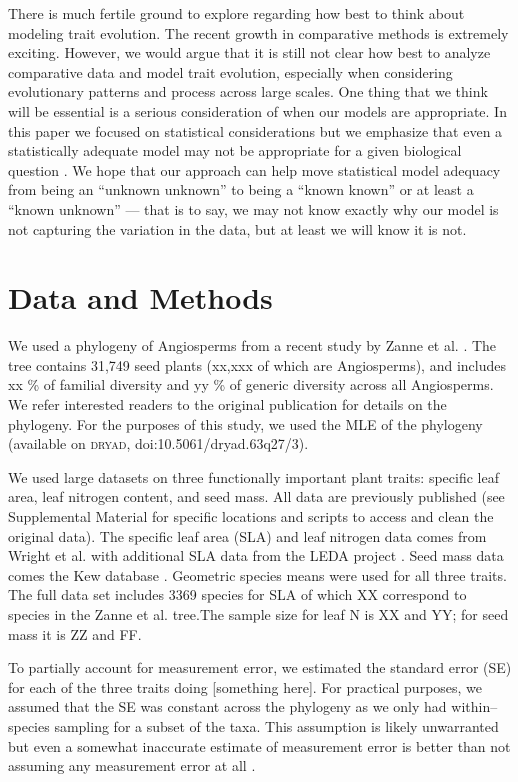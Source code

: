 \documentclass[a4paper,12pt]{article}
\begin{document}
There is much fertile ground to explore regarding how best to think about modeling trait evolution. The recent growth in comparative methods is extremely exciting. However, we would argue that it is still not clear how best to analyze comparative data and model trait evolution, especially when considering evolutionary patterns and process across large scales. One thing that we think will be essential is a serious consideration of when our models are appropriate. In this paper we focused on statistical considerations but we emphasize that even a statistically adequate model may not be appropriate for a given biological question \citep{Hansen2012}. We hope that our approach can help move statistical model adequacy from being an ``unknown unknown''  to being a ``known known'' or at least a ``known unknown'' --- that is to say, we may not know exactly why our model is not capturing the variation in the data, but at least we will know it is not.

\section{Data and Methods}

We used a phylogeny of Angiosperms from a recent study by Zanne et al. \citep{Zanne2013}. The tree contains 31,749 seed plants (xx,xxx of which are Angiosperms), and includes xx \% of familial diversity and yy \% of generic diversity across all Angiosperms. We refer interested readers to the original publication \citep{Zanne2013} for details on the phylogeny. For the purposes of this study, we used the MLE of the phylogeny (available on \textsc{dryad}, doi:10.5061/dryad.63q27/3).

We used large datasets on three functionally important plant traits: specific leaf area, leaf nitrogen content, and seed mass.  All data are previously published (see Supplemental Material for specific locations and scripts to access and clean the original data). The specific leaf area (SLA) and leaf nitrogen data comes from Wright et al. \citep{Wright2004} with additional SLA data from the LEDA project \citep{Kleyer2008}. Seed mass data comes the Kew database \citep{Kew2008}.  Geometric species means were used for all three traits.  The full data set includes 3369 species for SLA of which XX correspond to species in the Zanne et al. \citep{Zanne2013} tree.The sample size for leaf N is XX and YY; for seed mass it is ZZ and FF.  

To partially account for measurement error, we estimated the standard error (SE) for each of the three traits doing [something here]. For practical purposes, we assumed that the SE was constant across the phylogeny as we only had within--species sampling for a subset of the taxa. This assumption is likely unwarranted but even a somewhat inaccurate estimate of measurement error is better than not assuming any measurement error at all \citep{Hansen2012}.
\end{document}
